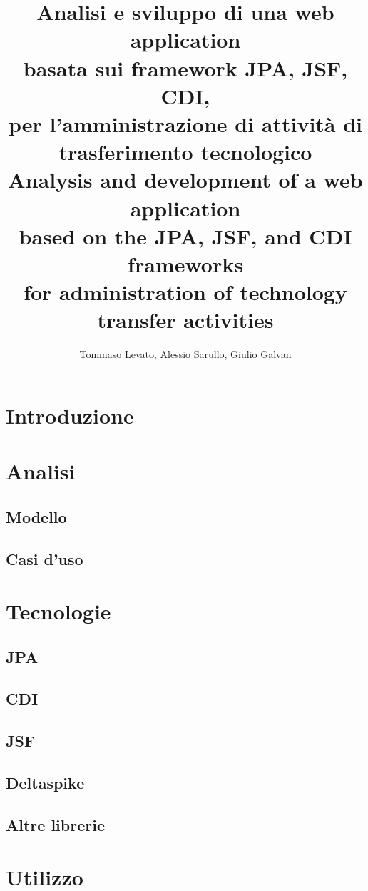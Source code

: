 \documentclass[a4paper,10pt]{report}
\title{Analisi e sviluppo di una web application \\
basata sui framework JPA, JSF, CDI, \\
per l'amministrazione di attività di trasferimento tecnologico\\\vspace{5cm}
Analysis and development of a web application \\
based on the JPA, JSF, and CDI frameworks \\
for administration of technology transfer activities
}
\author{Tommaso Levato, Alessio Sarullo, Giulio Galvan}
\begin{document}
\maketitle

\begin{abstract}
\end{abstract}

\tableofcontents

\chapter{Introduzione}

\chapter{Analisi}
\section{Modello}


\section{Casi d'uso}

\chapter{Tecnologie}
\label{chapter:Tecnologie}
\section{JPA}
\label{jpa}

\section{CDI} 
\label{cdi}

\section{JSF}
\label{jsf}

\section{Deltaspike}
\label{delta}

\section{Altre librerie}
\label{libs}

\chapter{Utilizzo}
\label{howto}
\end{document}
